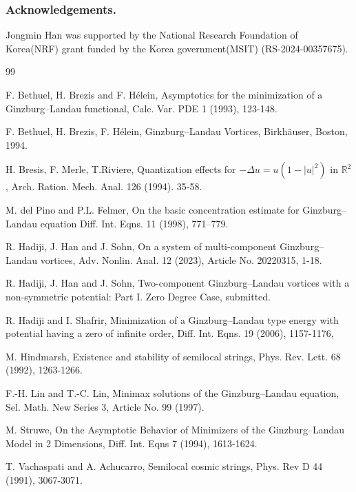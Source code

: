 \documentclass[a4paper,10pt,reqno]{amsart}
\theoremstyle{definition}
\newcommand{\rtwo}{{\mathbb R^2}}
\numberwithin{equation}{section}
\begin{document}
\bigskip
 \subsubsection*{\bf Acknowledgements.}
 Jongmin Han  was supported by the National Research Foundation of Korea(NRF) grant funded by the Korea government(MSIT) (RS-2024-00357675).


\small
 
\begin{thebibliography}{99}

F. Bethuel, H. Brezis and F. H\'{e}lein,
 Asymptotics for the minimization of a Ginzburg--Landau functional,
Calc. Var. PDE 1 (1993), 123-148.

F. Bethuel, H. Brezis, F. H\'{e}lein,
Ginzburg--Landau Vortices,
Birkh\"{a}user, Boston, 1994.

H. Bresis, F. Merle, T.Riviere,
Quantization effects for  $-\Delta u = u(1-|u|^2) $ in $\rtwo$,
Arch. Ration. Mech. Anal. 126 (1994). 35-58.

M. del Pino and P.L. Felmer, On the basic concentration estimate for Ginzburg--Landau  equation
Diff. Int. Eqns. 11  (1998), 771–779.
 
R. Hadiji, J. Han and J. Sohn,
On a system of multi-component Ginzburg--Landau vortices,
Adv. Nonlin.  Anal. 12  (2023), Article No. 20220315, 1-18.

R. Hadiji, J. Han and J. Sohn,
Two-component Ginzburg--Landau vortices with a non-symmetric potential: Part I. Zero Degree Case,
submitted.

R. Hadiji and I. Shafrir,
Minimization of a Ginzburg--Landau type energy with potential having a zero of infinite order,
Diff. Int. Eqns. 19 (2006), 1157-1176,


M. Hindmarsh,
Existence and stability of semilocal strings,
Phys. Rev. Lett. 68 (1992), 1263-1266.

F.-H. Lin and T.-C. Lin, Minimax solutions of the Ginzburg--Landau equation,
 Sel. Math.  New Series 3, Article No. 99 (1997). 
 

M. Struwe,
On the Asymptotic Behavior of Minimizers of the Ginzburg--Landau Model in 2 Dimensions,
Diff. Int. Eqns 7 (1994), 1613-1624.

T. Vachaspati and A. Achucarro,
Semilocal cosmic strings,
Phys. Rev D 44 (1991), 3067-3071.
\end{thebibliography}
\end{document}
